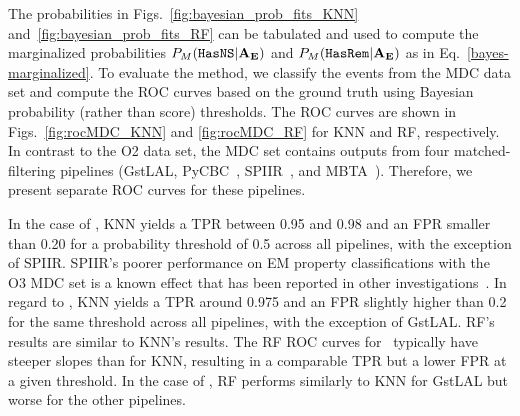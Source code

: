 

The probabilities in Figs.~\ref{fig:bayesian_prob_fits_KNN} and~\ref{fig:bayesian_prob_fits_RF} can be tabulated and used to compute the marginalized probabilities $P_M({{\tt HasNS}}|{\bf A}_{\bf E})$
and $P_M({{\tt HasRem}}|{\bf A}_{\bf E})$ as in Eq.~\eqref{bayes-marginalized}. To evaluate the method, we classify the events from the \ac{MDC} data set and compute the \ac{ROC} curves based on the
ground truth using Bayesian probability (rather than score) thresholds. The \ac{ROC} curves are shown in Figs.~\ref{fig:rocMDC_KNN} and \ref{fig:rocMDC_RF} for \ac{KNN} and \ac{RF},
respectively. In contrast to the \ac{O2} data set, the \ac{MDC} set contains outputs from four matched-filtering pipelines (GstLAL,  PyCBC~\cite{Usman:2015kfa}, SPIIR~\cite{Chu:2020pjv}, and
MBTA~\cite{Adams:2015ulm}). Therefore, we present separate \ac{ROC} curves for these pipelines. 


In the case of \hasns, \ac{KNN} yields a \ac{TPR} between 0.95 and 0.98 and an \ac{FPR} smaller than 0.20 for a probability threshold of 0.5 across all pipelines, with the exception of SPIIR. SPIIR's
poorer performance on \ac{EM} property classifications with the \ac{O3} \ac{MDC} set is a known effect that has been reported in other investigations~\cite{Chaudhary:2023vec}. In regard to \hasrem,
\ac{KNN} yields a \ac{TPR} around 0.975 and an \ac{FPR} slightly higher than 0.2 for the same threshold across all pipelines, with the exception of GstLAL. \ac{RF}'s results are similar to \ac{KNN}'s
results. The \ac{RF} \ac{ROC} curves for \hasns\ typically have steeper slopes than for \ac{KNN}, resulting in a comparable \ac{TPR} but a lower \ac{FPR} at a given threshold. In the case of \hasrem,
\ac{RF} performs similarly to \ac{KNN} for GstLAL but worse for the other pipelines.

